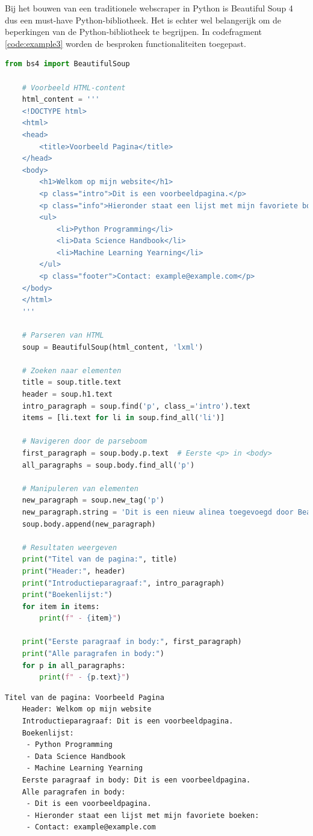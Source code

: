 Bij het bouwen van een traditionele webscraper  in Python is Beautiful Soup 4 dus een must-have Python-bibliotheek. Het is echter wel belangerijk om de beperkingen van de Python-bibliotheek te begrijpen. In codefragment \ref{code:example3} worden de besproken functionaliteiten toegepast.


\begin{lstlisting}[language=python, captionpos=b, caption=Een voorbeeld van de kernfunctionaliteiten van Beautiful Soup 4, label={code:example3}]
    from bs4 import BeautifulSoup

    # Voorbeeld HTML-content
    html_content = '''
    <!DOCTYPE html>
    <html>
    <head>
        <title>Voorbeeld Pagina</title>
    </head>
    <body>
        <h1>Welkom op mijn website</h1>
        <p class="intro">Dit is een voorbeeldpagina.</p>
        <p class="info">Hieronder staat een lijst met mijn favoriete boeken:</p>
        <ul>
            <li>Python Programming</li>
            <li>Data Science Handbook</li>
            <li>Machine Learning Yearning</li>
        </ul>
        <p class="footer">Contact: example@example.com</p>
    </body>
    </html>
    '''

    # Parseren van HTML
    soup = BeautifulSoup(html_content, 'lxml')

    # Zoeken naar elementen
    title = soup.title.text
    header = soup.h1.text
    intro_paragraph = soup.find('p', class_='intro').text
    items = [li.text for li in soup.find_all('li')]

    # Navigeren door de parseboom
    first_paragraph = soup.body.p.text  # Eerste <p> in <body>
    all_paragraphs = soup.body.find_all('p')

    # Manipuleren van elementen
    new_paragraph = soup.new_tag('p')
    new_paragraph.string = 'Dit is een nieuw alinea toegevoegd door Beautiful Soup.'
    soup.body.append(new_paragraph)

    # Resultaten weergeven
    print("Titel van de pagina:", title)
    print("Header:", header)
    print("Introductieparagraaf:", intro_paragraph)
    print("Boekenlijst:")
    for item in items:
        print(f" - {item}")

    print("Eerste paragraaf in body:", first_paragraph)
    print("Alle paragrafen in body:")
    for p in all_paragraphs:
        print(f" - {p.text}")
\end{lstlisting}

\begin{lstlisting}[language=text, caption={De output van code fragment \ref{code:example3}}, label={outuput:example1}]
    Titel van de pagina: Voorbeeld Pagina
    Header: Welkom op mijn website
    Introductieparagraaf: Dit is een voorbeeldpagina.
    Boekenlijst:
     - Python Programming
     - Data Science Handbook
     - Machine Learning Yearning
    Eerste paragraaf in body: Dit is een voorbeeldpagina.
    Alle paragrafen in body:
     - Dit is een voorbeeldpagina.
     - Hieronder staat een lijst met mijn favoriete boeken:
     - Contact: example@example.com
\end{lstlisting}


